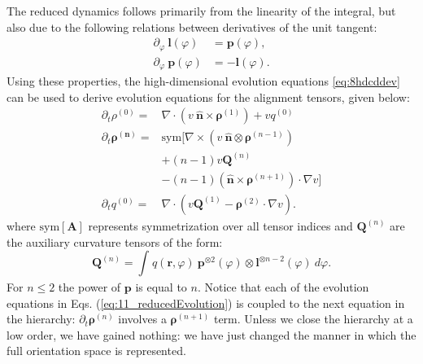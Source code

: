 The reduced dynamics follows primarily from the linearity of the integral, but also due to the following relations
between derivatives of the unit tangent:
\begin{subequations}
\begin{align}
    \partial_{\varphi}\ \boldsymbol{l}(\varphi) &= \boldsymbol{p}(\varphi),\\
    \partial_{\varphi}\ \boldsymbol{p}(\varphi) &= - \boldsymbol{l}(\varphi).
\end{align}
\end{subequations}
Using these properties, the high-dimensional evolution equations \cref{eq:8hdcddev} can be used to derive
evolution equations for the alignment tensors, given below:
\begin{subequations}\label{eq:11_reducedEvolution}
\begin{align}
    \partial_{t}\rho^{(0)} =& \nabla \cdot \left( v\boldsymbol{\ }\hat{\boldsymbol{n}}\times\boldsymbol{\rho}^{\left(1 \right)} \right)+vq^{(0)}\\
    \partial_{t}\boldsymbol{\rho}^{\left( \boldsymbol{n} \right)}=&\text{sym}\Bigg\lbrack \nabla\times\left( v\ \hat{\boldsymbol{n}}\otimes \boldsymbol{\rho}^{\left( n - 1 \right)} \right)\nonumber\\
    &+(n - 1)v\mathbf{Q}^{(n)} \nonumber\\
    &- (n - 1)\left( \hat{\boldsymbol{n}}\times\boldsymbol{\rho}^{(n + 1)} \right) \cdot \nabla v \Bigg\rbrack\\
    \partial_{t}q^{(0)} =& \nabla \cdot \left( v\mathbf{Q}^{(1)} - \boldsymbol{\rho}^{(2)}\cdot\nabla v \right).
\end{align}
\end{subequations}
where $\text{sym}[\mathbf{A}]$ represents symmetrization over all tensor indices and \(\mathbf{Q}^{(n)}\) are the auxiliary curvature tensors of
the form:
\begin{equation}
\mathbf{Q}^{(n)}=\int_{}^{}{q\left( \boldsymbol{r},\varphi \right)\ \boldsymbol{p}^{\otimes 2}(\varphi)\otimes \boldsymbol{l}^{\otimes n - 2}(\varphi)}\boldsymbol{\ }d\varphi.
\end{equation}
For \(n \leq 2\) the power of \(\boldsymbol{p}\) is equal to \(n\). Notice
that each of the evolution equations in Eqs. (\ref{eq:11_reducedEvolution}) is coupled to the next equation in the hierarchy:
\(\partial_{t}\boldsymbol{\rho}^{(n)}\) involves a \(\boldsymbol{\rho}^{(n + 1)}\) term. Unless we
close the hierarchy at a low order, we have gained nothing: we have just
changed the manner in which the full orientation space is represented.

